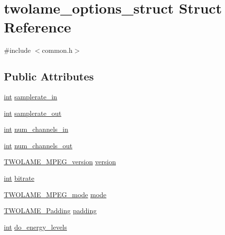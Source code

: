 \hypertarget{structtwolame__options__struct}{}\section{twolame\+\_\+options\+\_\+struct Struct Reference}
\label{structtwolame__options__struct}


{\ttfamily \#include $<$common.\+h$>$}

\subsection*{Public Attributes}
\begin{DoxyCompactItemize}
\item 
\hyperlink{xmltok_8h_a5a0d4a5641ce434f1d23533f2b2e6653}{int} \hyperlink{structtwolame__options__struct_a82eea31e571027820c8fc63c159f97be}{samplerate\+\_\+in}
\item 
\hyperlink{xmltok_8h_a5a0d4a5641ce434f1d23533f2b2e6653}{int} \hyperlink{structtwolame__options__struct_a6c0025d3edc48ae42a8f72fab21ce1a6}{samplerate\+\_\+out}
\item 
\hyperlink{xmltok_8h_a5a0d4a5641ce434f1d23533f2b2e6653}{int} \hyperlink{structtwolame__options__struct_aa0fb8d44a4383631bea2b0fa37f01eff}{num\+\_\+channels\+\_\+in}
\item 
\hyperlink{xmltok_8h_a5a0d4a5641ce434f1d23533f2b2e6653}{int} \hyperlink{structtwolame__options__struct_a5388d86ab861953b968b2ec81bda950f}{num\+\_\+channels\+\_\+out}
\item 
\hyperlink{twolame_8h_a0f4e287fec57b8ba38e28395996eb6e3}{T\+W\+O\+L\+A\+M\+E\+\_\+\+M\+P\+E\+G\+\_\+version} \hyperlink{structtwolame__options__struct_a8bfca52309d5777333b4646461ab9a16}{version}
\item 
\hyperlink{xmltok_8h_a5a0d4a5641ce434f1d23533f2b2e6653}{int} \hyperlink{structtwolame__options__struct_ac471f69e776fa200a2032a88dfdee3b0}{bitrate}
\item 
\hyperlink{twolame_8h_a91879045676d9146c9bfcb8b0a30b57f}{T\+W\+O\+L\+A\+M\+E\+\_\+\+M\+P\+E\+G\+\_\+mode} \hyperlink{structtwolame__options__struct_a9a485b580a62dd91ca9d2b6c51cbddb5}{mode}
\item 
\hyperlink{twolame_8h_af83f4f73e4c57db45269667b4421730e}{T\+W\+O\+L\+A\+M\+E\+\_\+\+Padding} \hyperlink{structtwolame__options__struct_aed52eccbde57b496f02e1f19e2ff9eb3}{padding}
\item 
\hyperlink{xmltok_8h_a5a0d4a5641ce434f1d23533f2b2e6653}{int} \hyperlink{structtwolame__options__struct_a404e8d457ac5ba63be0144540ce035a9}{do\+\_\+energy\+\_\+levels}

\end{DoxyCompactItemize}
